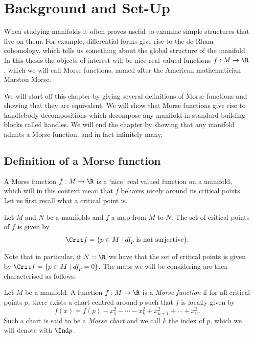 \chapter{Background and Set-Up}
\label{chap:morse-theory}
\vspace*{-0.9cm}


When studying manifolds it often proves useful to examine simple structures that live on them. For example, differential forms give rise to the de Rham cohomology, which tells us something about the global structure of the manifold.
In this thesis the objects of interest will be nice real valued functions $f: M \to  \R$, which we will call Morse functions, named after the American mathematician Marston Morse.

We will start off this chapter by giving several definitions of Morse functions and showing that they are equivalent.
We will show that Morse functions give rise to handlebody decompositions which decompose any manifold in standard building blocks called handles.
We will end the chapter by showing that any manifold admits a Morse function, and in fact infinitely many.

\section{Definition of a Morse function}

A Morse function $f: M \to \R$ is a `nice' real valued function on a manifold, which will in this context mean that $f$ behaves nicely around its critical points. Let us first recall what a critical point is.

\begin{definition}
    Let $M$ and $N$ be a manifolds and  $f$ a map from $M$ to $N$.
    The set of critical points of $f$ is given by
    \[
    \Crit f = \{p \in M  \mid \text{$df_p$ is not surjective}\} 
    .\] 
\end{definition}
Note that in particular, if $N = \R$ we have that the set of critical points is given by $\Crit f = \{ p \in M  \mid  df_p = 0\}$.  The maps we will be considering are then characterised as follows:
\begin{definition}
    Let $M$ be a manifold.
    A function $f: M \to  \R$ is a \emph{Morse function} if for all critical points $p$, there exists a chart centred around $p$ such that $f$ is locally given by
    \[
        f(x) = f(p) -x_1^2 - \cdots - x_k^2 + x_{k+1}^2 + \cdots + x_n^2
    .\] 
    Such a chart is said to be a \emph{Morse chart} and we call $k$ the index of $p$, which we will denote with $\Ind p$.
\end{definition}

